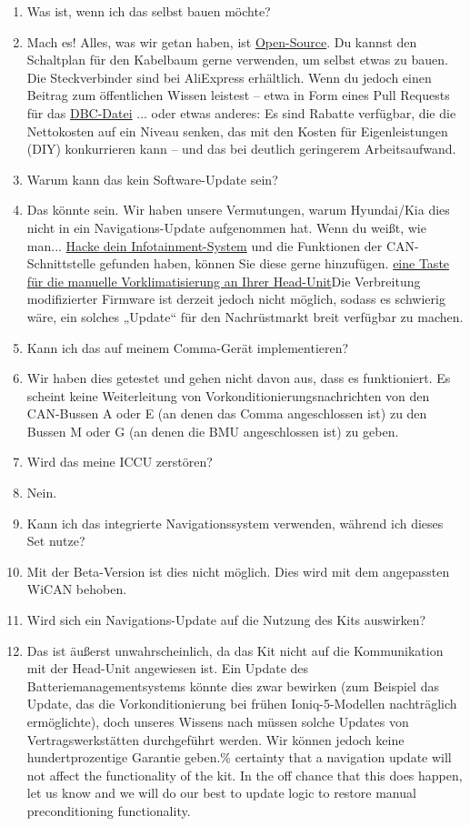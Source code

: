 \documentclass[superscriptaddress,onecolumn,floatfix]{revtex4-2}
\begin{document}
\begin{enumerate}
  \item[F:] Was ist, wenn ich das selbst bauen möchte?
  \item[A:] Mach es! Alles, was wir getan haben, ist \href{https://github.com/tylerharvey/Ioniq5_CAN}{Open-Source}. Du kannst den Schaltplan für den Kabelbaum gerne verwenden, um selbst etwas zu bauen. Die Steckverbinder sind bei AliExpress erhältlich. Wenn du jedoch einen Beitrag zum öffentlichen Wissen leistest – etwa in Form eines Pull Requests für das \href{https://github.com/dragz/egmpdbc}{DBC-Datei} ... oder etwas anderes: Es sind Rabatte verfügbar, die die Nettokosten auf ein Niveau senken, das mit den Kosten für Eigenleistungen (DIY) konkurrieren kann – und das bei deutlich geringerem Arbeitsaufwand.
  \item[F:] Warum kann das kein Software-Update sein?
  \item[A:] Das könnte sein. Wir haben unsere Vermutungen, warum Hyundai/Kia dies nicht in ein Navigations-Update aufgenommen hat. Wenn du weißt, wie man... \href{https://discord.gg/zyrngQ5qQ}{Hacke dein Infotainment-System} und die Funktionen der CAN-Schnittstelle gefunden haben, können Sie diese gerne hinzufügen. \href{https://www.reddit.com/r/KiaEV6/comments/1jdd56u/comment/mid9xie/}{eine Taste für die manuelle Vorklimatisierung an Ihrer Head-Unit}Die Verbreitung modifizierter Firmware ist derzeit jedoch nicht möglich, sodass es schwierig wäre, ein solches „Update“ für den Nachrüstmarkt breit verfügbar zu machen.
  \item[F:] Kann ich das auf meinem Comma-Gerät implementieren?
  \item[A:] Wir haben dies getestet und gehen nicht davon aus, dass es funktioniert. Es scheint keine Weiterleitung von Vorkonditionierungsnachrichten von den CAN-Bussen A oder E (an denen das Comma angeschlossen ist) zu den Bussen M oder G (an denen die BMU angeschlossen ist) zu geben.
  \item[F:] Wird das meine ICCU zerstören?
  \item[A:] Nein.
  \item[F:] Kann ich das integrierte Navigationssystem verwenden, während ich dieses Set nutze?
  \item[A:] Mit der Beta-Version ist dies nicht möglich. Dies wird mit dem angepassten WiCAN behoben.
  \item[F:] Wird sich ein Navigations-Update auf die Nutzung des Kits auswirken?
  \item[A:] Das ist äußerst unwahrscheinlich, da das Kit nicht auf die Kommunikation mit der Head-Unit angewiesen ist. Ein Update des Batteriemanagementsystems könnte dies zwar bewirken (zum Beispiel das Update, das die Vorkonditionierung bei frühen Ioniq-5-Modellen nachträglich ermöglichte), doch unseres Wissens nach müssen solche Updates von Vertragswerkstätten durchgeführt werden. Wir können jedoch keine hundertprozentige Garantie geben.\% certainty that a navigation update will not affect the functionality of the kit. In the off chance that this does happen, let us know and we will do our best to update logic to restore manual preconditioning functionality.

\end{enumerate}
\end{document}
